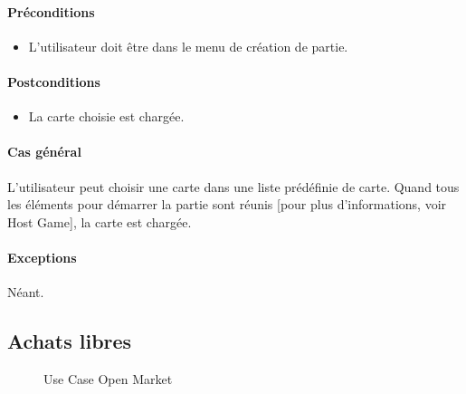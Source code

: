 \documentclass[a4paper,11pt]{report}
\begin{document}
\paragraph{Préconditions}
\begin{itemize}
 \item L'utilisateur doit être dans le menu de création de partie.
\end{itemize}
\paragraph{Postconditions}
\begin{itemize}
 \item La carte choisie est chargée.
\end{itemize}
\paragraph{Cas général}
L'utilisateur peut choisir une carte dans une liste prédéfinie de carte. Quand tous les éléments pour démarrer la partie
sont réunis [pour plus d'informations, voir Host Game], la carte est chargée.
\paragraph{Exceptions} Néant.

\newpage
\subsection{Achats libres}
\begin{figure}[ht]
    \caption{Use Case Open Market}
\end{figure}
\end{document}
